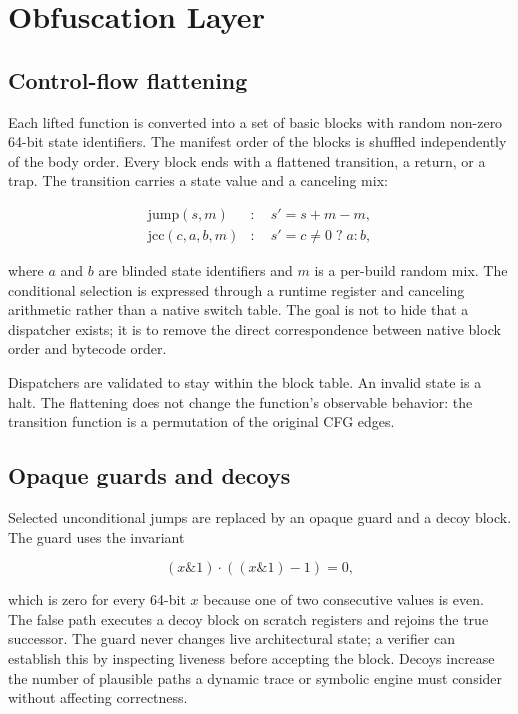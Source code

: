 \section{Obfuscation Layer}
\label{sec:obfuscation}

\subsection{Control-flow flattening}

Each lifted function is converted into a set of basic blocks with random
non-zero 64-bit state identifiers. The manifest order of the blocks is shuffled
independently of the body order. Every block ends with a flattened transition,
a return, or a trap. The transition carries a state value and a canceling mix:

\begin{align}
  \text{jump}(s, m) &: \quad s' = s + m - m, \label{eq:jump}\\
  \text{jcc}(c, a, b, m) &: \quad s' = c \neq 0 \;?\; a : b,
  \label{eq:jcc}
\end{align}

where $a$ and $b$ are blinded state identifiers and $m$ is a per-build random
mix. The conditional selection is expressed through a runtime register and
canceling arithmetic rather than a native switch table. The goal is not to hide
that a dispatcher exists; it is to remove the direct correspondence between
native block order and bytecode order.

Dispatchers are validated to stay within the block table. An invalid state is a
 halt. The flattening does not change the function's observable
behavior: the transition function is a permutation of the original CFG edges.

\subsection{Opaque guards and decoys}

Selected unconditional jumps are replaced by an opaque guard and a decoy block.
The guard uses the invariant

\begin{equation}
  (x \mathbin{\&} 1) \cdot ((x \mathbin{\&} 1) - 1) = 0,
  \label{eq:opaque}
\end{equation}

which is zero for every 64-bit $x$ because one of two consecutive values is even.
The false path executes a decoy block on scratch registers and rejoins the true
successor. The guard never changes live architectural state; a verifier can
establish this by inspecting liveness before accepting the block. Decoys
increase the number of plausible paths a dynamic trace or symbolic engine must
consider without affecting correctness.

